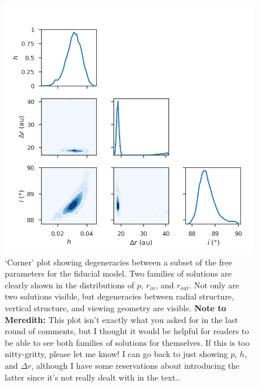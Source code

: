 \documentclass[12pt,oneside]{article}
\begin{document}
\begin{figure}
  \centering
  \includegraphics[width=0.9\linewidth]{figures/degeneracy_corner}
  \caption{`Corner' plot showing degeneracies between a subset of the free parameters for the fiducial model.
  Two families of solutions are clearly shown in the distributions of $p$, $r_{in}$, and $r_{out}$.
  Not only are two solutions visible, but degeneracies between radial structure, vertical structure, and viewing geometry are visible.
  \textbf{Note to Meredith:} This plot isn't exactly what you asked for in the last round of comments, but I thought it would be helpful for readers to be able to see both families of solutions for themselves. If this is too nitty-gritty, please let me know! I can go back to just showing $p$, $h$, and $\Delta r$, although I have some reservations about introducing the latter since it's not really dealt with in the text..}
  \label{fig: degeneracies}
\end{figure}
\end{document}
